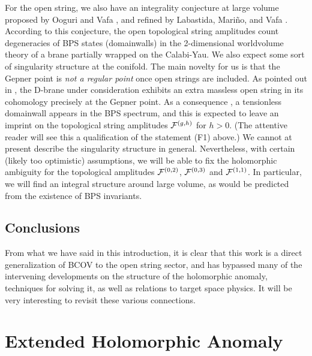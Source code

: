 For the open string, we also have an integrality conjecture at large 
volume proposed by Ooguri and Vafa \cite{oova}, and refined by Labastida, 
Mari\~no, and Vafa \cite{lmv}. According to this conjecture, the open 
topological string amplitudes count degeneracies of BPS states 
(domainwalls) in the 2-dimensional worldvolume theory of a brane 
partially wrapped on the Calabi-Yau. We also expect some sort of 
singularity structure at the conifold. The main novelty for us is that 
the Gepner point is {\it not a regular point} once open strings are 
included. As pointed out in \cite{bdlr,howa}, the D-brane under consideration 
exhibits an extra massless open string in its cohomology precisely at the 
Gepner point. As a consequence \cite{open}, a tensionless domainwall 
appears in the BPS spectrum, and this is expected to leave an imprint on 
the topological string amplitudes ${{\cal F}}^{(g,h)}$ for $h>0$. (The attentive reader 
will see this a qualification of the statement (F1) above.) We cannot at 
present describe the singularity structure in general. Nevertheless, with 
certain (likely too optimistic) assumptions, we will be able to fix the 
holomorphic ambiguity for the topological amplitudes ${{\cal F}}^{(0,2)}$, ${{\cal F}}^{(0,3)}$ and 
${{\cal F}}^{(1,1)}$. In particular, we will find an integral structure around large 
volume, as would be predicted from the existence of BPS invariants.


\subsection{Conclusions}

From what we have said in this introduction, it is clear that this
work is a direct generalization of BCOV to the open string sector,
and has bypassed many of the intervening developments on the structure
of the holomorphic anomaly, techniques for solving it, as well as
relations to target space physics. It will be very interesting to
revisit these various connections. 


\enlargethispage{.6cm}

\section{Extended Holomorphic Anomaly}

